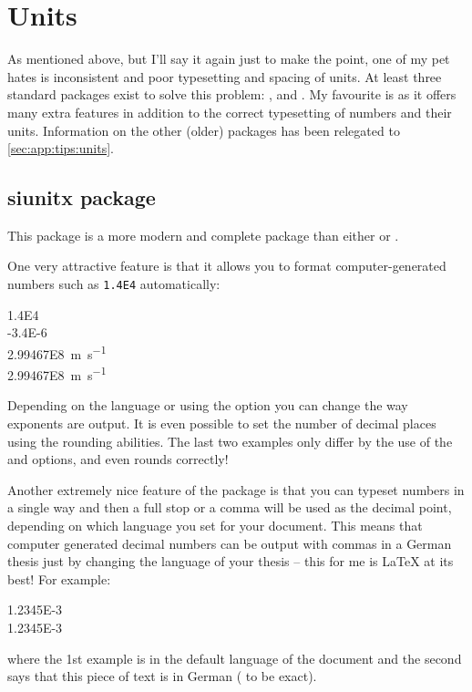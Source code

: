 \section{Units}%
\label{sec:tips:units}

As mentioned above, but I'll say it again just to make the point,
one of my pet hates is inconsistent and poor typesetting and spacing
of units. At least three standard packages exist to solve this
problem: ,  and . My
favourite is  as it offers many extra features in
addition to the correct typesetting of numbers and their units.
Information on the other (older) packages has been relegated to
\cref{sec:app:tips:units}.


\subsection{siunitx package}%
\label{sec:tips:siunitx}

This package is a more modern and complete package than either
 or .

One very attractive feature is that it allows you to format
computer-generated numbers
such as \verb+1.4E4+ automatically:
\begin{tcblisting}{}
\num{1.4E4}\\
\num[exponent-product=\cdot]{-3.4E-6}\\
\qty{2.99467E8}{\metre\per\second}\\
\qty[round-mode=places,round-precision=1]{2.99467E8}{\m.\s^{-1}}
\end{tcblisting}
\noindent
Depending on the language or using the option 
you can change the way exponents are output.
It is even possible to set the number of decimal places
using the rounding abilities.
The last two examples only differ by the use of the  and
 options, and even rounds correctly!

Another extremely nice feature of the package is that you can typeset
numbers in a single way and then a full stop or a comma will be used
as the decimal point, depending on which language you set for your
document. This means that computer generated decimal numbers can be
output with commas in a German thesis just by changing the language of
your thesis -- this for me is \LaTeX{} at its best! For example:
\begin{tcblisting}{}
\num{1.2345E-3}\\
\foreignlanguage{ngerman}{\num{1.2345E-3}}
\end{tcblisting}
\noindent
where the 1st example is in the default language of the document and
the second says that this piece of text is in German
( to be exact).

